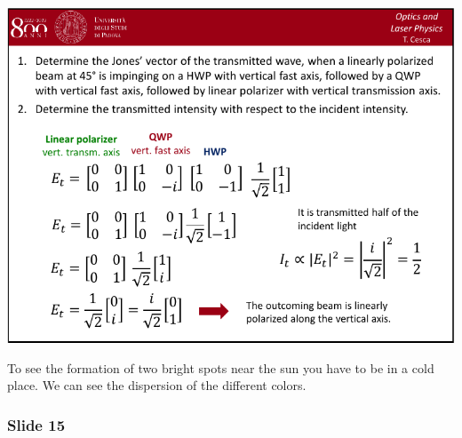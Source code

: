 \documentclass[../main/main.tex]{subfiles}
\begin{document}
\begin{minipage}[]{0.5\linewidth}
\centering
\includegraphics[page=14,width=1\textwidth]{../lessons/pdf_file/04_lecture.pdf}
\end{minipage}
\hspace{0.3cm}\vspace{0.3cm}
\begin{minipage}[c]{0.47\linewidth}

To see the formation of two bright spots near the sun you have to be in a cold place. We can see the dispersion of the different colors.

\end{minipage}

\subsubsection*{Slide 15}
\end{document}
